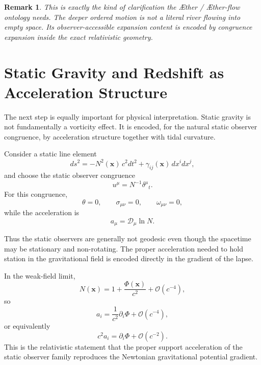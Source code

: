 \documentclass[11pt]{article}
\newcommand{\Aether}{\AE{}ther}
\newcommand{\Aflow}{\AE{}ther-flow}
\newcommand{\Proj}{\mathcal{D}}
\newtheorem{remark}{Remark}
\begin{document}
\begin{remark}
This is exactly the kind of clarification the \Aether{} / \Aflow{} ontology needs. The deeper ordered motion is not a literal river flowing into empty space. Its observer-accessible expansion content is encoded by congruence expansion inside the exact relativistic geometry.
\end{remark}

\section{Static Gravity and Redshift as Acceleration Structure}

The next step is equally important for physical interpretation. Static gravity is not fundamentally a vorticity effect. It is encoded, for the natural static observer congruence, by acceleration structure together with tidal curvature.

Consider a static line element
\begin{equation}
ds^2
=
-N^2(\mathbf{x})\,c^2dt^2
+
\gamma_{ij}(\mathbf{x})\,dx^i dx^j,
\label{eq:staticmetric}
\end{equation}
and choose the static observer congruence
\begin{equation}
u^\mu = N^{-1}\delta^\mu{}_t.
\label{eq:staticu}
\end{equation}
For this congruence,
\begin{equation}
\theta=0,
\qquad
\sigma_{\mu\nu}=0,
\qquad
\omega_{\mu\nu}=0,
\label{eq:statickinematics}
\end{equation}
while the acceleration is
\begin{equation}
a_\mu = \Proj_\mu \ln N.
\label{eq:staticacceleration}
\end{equation}

Thus the static observers are generally not geodesic even though the spacetime may be stationary and non-rotating. The proper acceleration needed to hold station in the gravitational field is encoded directly in the gradient of the lapse.

In the weak-field limit,
\begin{equation}
N(\mathbf{x})
=
1+\frac{\Phi(\mathbf{x})}{c^2}
+\mathcal{O}(c^{-4}),
\label{eq:lapseweakfield}
\end{equation}
so
\begin{equation}
a_i
=
\frac{1}{c^2}\partial_i \Phi
+\mathcal{O}(c^{-4}),
\label{eq:weakfieldacceleration}
\end{equation}
or equivalently
\begin{equation}
c^2 a_i
=
\partial_i \Phi
+\mathcal{O}(c^{-2}).
\label{eq:physicalacceleration}
\end{equation}
This is the relativistic statement that the proper support acceleration of the static observer family reproduces the Newtonian gravitational potential gradient.
\end{document}
